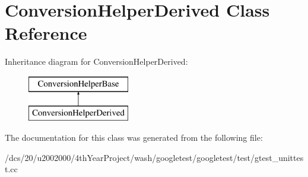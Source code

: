 \hypertarget{classConversionHelperDerived}{}\section{Conversion\+Helper\+Derived Class Reference}
\label{classConversionHelperDerived}
Inheritance diagram for Conversion\+Helper\+Derived\+:\begin{figure}[H]
\begin{center}
\leavevmode
\includegraphics[height=2.000000cm]{classConversionHelperDerived}
\end{center}
\end{figure}


The documentation for this class was generated from the following file\+:\begin{DoxyCompactItemize}
\item 
/dcs/20/u2002000/4th\+Year\+Project/wash/googletest/googletest/test/gtest\+\_\+unittest.\+cc\end{DoxyCompactItemize}
